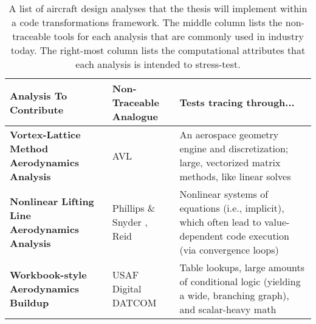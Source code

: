\begin{table}[H]

    \centering
    \caption{A list of aircraft design analyses that the thesis will implement within a code transformations framework. The middle column lists the non-traceable tools for each analysis that are commonly used in industry today. The right-most column lists the computational attributes that each analysis is intended to stress-test.}
    \label{tab:models_to_contribute}

    \begin{adjustbox}{width=\textwidth}

        \begin{tabularx}{1.2\textwidth}{M E D}
            \toprule
            \textbf{Analysis To Contribute}                            & \textbf{Non-Traceable Analogue}                                               & \textbf{Tests tracing through...}                                                                                           \\ \toprule
            \textbf{Vortex-Lattice Method Aerodynamics Analysis}       & AVL \cite{avl}                                                                & An aerospace geometry engine and discretization; large, vectorized matrix methods, like linear solves                       \\ \midrule
            \textbf{Nonlinear Lifting Line Aerodynamics Analysis}      & Phillips \& Snyder \cite{phillips_modern_2000}, Reid \cite{reid_general_2020} & Nonlinear systems of equations (i.e., implicit), which often lead to value-dependent code execution (via convergence loops) \\ \midrule
            \textbf{Workbook-style Aerodynamics Buildup}               & USAF Digital DATCOM \cite{datcom}                                             & Table lookups, large amounts of conditional logic (yielding a wide, branching graph), and scalar-heavy math                 \\ \midrule

\end{tabularx}
\end{adjustbox}
\end{table}
